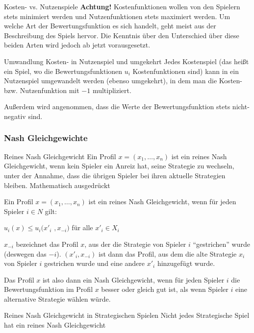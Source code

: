 \documentclass{panikzettel}
\begin{document}
{\begin{defi}{Kosten- vs. Nutzenspiele}
	\textbf{\color{red} Achtung!} Kostenfunktionen wollen von den Spielern stets minimiert werden und Nutzenfunktionen stets maximiert werden. Um welche Art der Bewertungsfunktion es sich handelt, geht meist aus der Beschreibung des Spiels hervor. Die Kenntnis über den Unterschied über diese beiden Arten wird jedoch ab jetzt vorausgesetzt.
\end{defi}

\begin{theo}{Umwandlung Kosten- in Nutzenspiel und umgekehrt}
	Jedes Kostenspiel (das heißt ein Spiel, wo die Bewertungsfunktionen $u_i$ Kostenfunktionen sind) kann in ein Nutzenspiel umgewandelt werden (ebenso umgekehrt), in dem man die Kosten- bzw. Nutzenfunktion mit $-1$ multipliziert.
	
	Außerdem wird angenommen, dass die Werte der Bewertungsfunktion stets nicht-negativ sind.
\end{theo}

\subsubsection{Nash Gleichgewichte}

\begin{defi}{Reines Nash Gleichgewicht}
	Ein Profil $x = (x_1, \dots, x_n)$ ist ein reines Nash Gleichgewicht, wenn kein Spieler ein Anreiz hat, seine Strategie zu wechseln, unter der Annahme, dass die übrigen Spieler bei ihren aktuelle Strategien bleiben. Mathematisch ausgedrückt
	
	Ein Profil $x = (x_1, \dots, x_n)$ ist ein reines Nash Gleichgewicht, wenn für jeden Spieler $i \in N$ gilt:
	
	\begin{center}
		$u_i(x) \leq u_i(x'_i$ $, x_{-i})$ für alle $x'_i \in X_i$
	\end{center}
	
	$x_{-i}$ bezeichnet das Profil $x$, aus der die Strategie von Spieler $i$ ``gestrichen'' wurde (deswegen das $-i$). $(x'_i, x_{-i})$ ist dann das Profil, aus dem die alte Strategie $x_i$ von Spieler $i$ gestrichen wurde und eine andere $x'_i$ hinzugefügt wurde. 
	
	Das Profil $x$ ist also dann ein Nash Gleichgewicht, wenn für jeden Spieler $i$ die Bewertungsfunktion im Profil $x$ besser oder gleich gut ist, als wenn Spieler $i$ eine alternative Strategie wählen würde.
\end{defi}

\begin{theo}{Reines Nash Gleichgewicht in Strategischen Spielen}
	Nicht jedes Strategische Spiel hat ein reines Nash Gleichgewicht
\end{theo}

}
\end{document}
